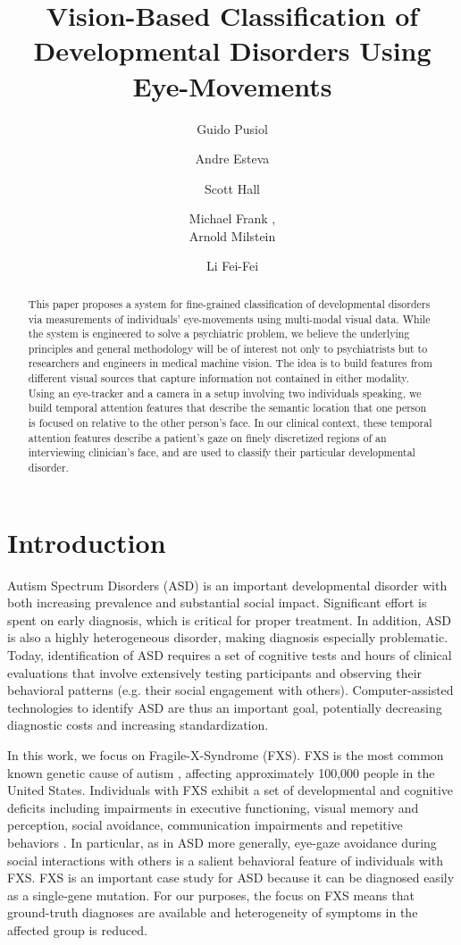 \documentclass{llncs}
\title{Vision-Based Classification of Developmental Disorders Using Eye-Movements  \vspace{-1em}}
\author{
    	Guido Pusiol\inst{1} \and Andre Esteva\inst{2}
  	\and Scott Hall \inst{3}
	\and Michael Frank \inst{4},\\
	 Arnold Milstein\inst{5}
	\and Li Fei-Fei \inst{1}
	}
\institute{Dept. of Computer Science, Stanford University, USA\\
  	\and
  	Dept. of Electrical Engineering, Stanford University, USA\\
  	\and
  	Dept. of Psychiatry, Stanford University, USA\\
	\and
  	Dept. of Psychology, Stanford University, USA \\
	\and
  	Dept. of Medicine, Stanford University, USA \\
  }
\begin{document}
   \maketitle
  \begin{abstract}
   \vspace{-0.5em}
    This paper proposes a system for fine-grained classification of developmental disorders via measurements of individuals' eye-movements using multi-modal visual data. While the system is engineered to solve a psychiatric problem, we believe the underlying principles and general methodology will be of interest not only to psychiatrists but to researchers and engineers in medical machine vision. The idea is to build features from different visual sources that capture information not contained in either modality. Using an eye-tracker and a camera in a setup involving two individuals speaking, we build temporal attention features that describe the semantic location that one person is focused on relative to the other person's face. In our clinical context, these temporal attention features describe a patient's gaze on finely discretized regions of an interviewing clinician's face, and are used to classify their particular developmental disorder. 
  \end{abstract}
  
  \vspace{-2.5em}
  \section{Introduction}
  \vspace{-1em}
 Autism Spectrum Disorders (ASD) is an important developmental disorder with both increasing prevalence and substantial social impact. Significant effort is spent on early diagnosis, which is critical for proper treatment. In addition, ASD is also a highly heterogeneous disorder, making diagnosis especially problematic. Today, identification of ASD requires a set of cognitive tests and hours of clinical evaluations that involve extensively testing participants and observing their behavioral patterns (e.g. their social engagement with others). Computer-assisted technologies to identify ASD are thus an important goal, potentially decreasing diagnostic costs and increasing standardization.

  In this work, we focus on Fragile-X-Syndrome (FXS). FXS is the most common known genetic cause of autism \cite{Hagerman:2008wg}, affecting approximately 100,000 people in the United States. Individuals with FXS exhibit a set of developmental and cognitive deficits including impairments in executive functioning, visual memory and perception, social avoidance, communication impairments and repetitive behaviors \cite{Sullivan:2007gz}. In particular, as in ASD more generally, eye-gaze avoidance during social interactions with others is a salient behavioral feature of individuals with FXS. FXS is an important case study for ASD because it can be diagnosed easily as a single-gene mutation. For our purposes, the focus on FXS means that ground-truth diagnoses are available and heterogeneity of symptoms in the affected group is reduced.
\end{document}
